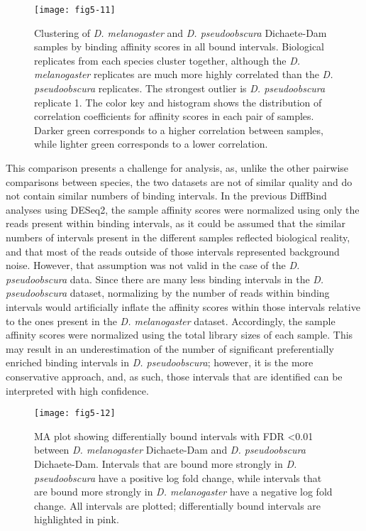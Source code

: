 \begin{figure}
\centering
\texttt{[image: fig5-11]}
\caption[Clustering of \emph{D. melanogaster} and \emph{D. pseudoobscura} Dichaete-Dam samples by binding affinity scores in all bound intervals]{Clustering of \emph{D. melanogaster} and \emph{D. pseudoobscura} Dichaete-Dam samples by binding affinity scores in all bound intervals. Biological replicates from each species cluster  together, although the \emph{D. melanogaster} replicates are much more highly correlated than the \emph{D. pseudoobscura} replicates. The strongest outlier is \emph{D. pseudoobscura} replicate 1. The color key and histogram shows the distribution of correlation coefficients for affinity scores in each pair of samples. Darker green corresponds to a higher correlation between samples, while lighter green corresponds to a lower correlation.}
\label{Figure 5.11}
\end{figure}

This comparison presents a challenge for analysis, as, unlike the other pairwise comparisons between species, the two datasets are not of similar quality and do not contain similar numbers of binding intervals. In the previous DiffBind analyses using DESeq2, the sample affinity scores were normalized using only the reads present within binding intervals, as it could be assumed that the similar numbers of intervals present in the different samples reflected biological reality, and that most of the reads outside of those intervals represented background noise. However, that assumption was not valid in the case of the \emph{D. pseudoobscura} data. Since there are many less binding intervals in the \emph{D. pseudoobscura} dataset, normalizing by the number of reads within binding intervals would artificially inflate the affinity scores within those intervals relative to the ones present in the \emph{D. melanogaster} dataset. Accordingly, the sample affinity scores were normalized using the total library sizes of each sample. This may result in an underestimation of the number of significant preferentially enriched binding intervals in \emph{D. pseudoobscura}; however, it is the more conservative approach, and, as such, those intervals that are identified can be interpreted with high confidence.

\begin{figure}
\centering
\texttt{[image: fig5-12]}
\caption[Differentially bound intervals with FDR \textless 0.01 between \emph{D. melanogaster} Dichaete-Dam and \emph{D. pseudoobscura} Dichaete-Dam]{MA plot showing differentially bound intervals with FDR \textless 0.01 between \emph{D. melanogaster} Dichaete-Dam and \emph{D. pseudoobscura} Dichaete-Dam. Intervals that are bound more strongly in \emph{D. pseudoobscura} have a positive log fold change, while intervals that are bound more strongly in \emph{D. melanogaster} have a negative log fold change. All intervals are plotted; differentially bound intervals are highlighted in pink.}
\label{Figure 5.12}
\end{figure}

